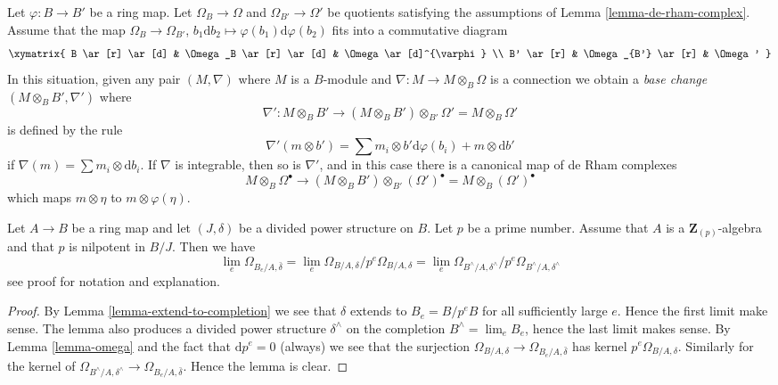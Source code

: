 \begin{remark}
\label{remark-base-change-connection}
Let $\varphi : B \to B'$ be a ring map. Let $\Omega_B \to \Omega$ and
$\Omega_{B'} \to \Omega'$ be quotients satisfying the assumptions of
Lemma \ref{lemma-de-rham-complex}. Assume that the map
$\Omega_B \to \Omega_{B'}$,
$b_1\text{d}b_2 \mapsto \varphi(b_1)\text{d}\varphi(b_2)$ fits into a
commutative diagram
$$
\xymatrix{
B \ar[r] \ar[d] & \Omega_B \ar[r] \ar[d] & \Omega \ar[d]^{\varphi} \\
B' \ar[r] & \Omega_{B'} \ar[r] & \Omega'
}
$$
In this situation, given any pair $(M, \nabla)$ where $M$ is a $B$-module
and $\nabla : M \to M \otimes_B \Omega$ is a connection
we obtain a {\it base change} $(M \otimes_B B', \nabla')$ where
$$
\nabla' :
M \otimes_B B'
\longrightarrow
(M \otimes_B B') \otimes_{B'} \Omega' = M \otimes_B \Omega'
$$
is defined by the rule
$$
\nabla'(m \otimes b') =
\sum m_i \otimes b'\text{d}\varphi(b_i) + m \otimes \text{d}b' 
$$
if $\nabla(m) = \sum m_i \otimes \text{d}b_i$. If $\nabla$ is integrable,
then so is $\nabla'$, and in this case there is a canonical map of
de Rham complexes
\begin{equation}
\label{equation-base-change-map-complexes}
M \otimes_B \Omega^\bullet
\longrightarrow
(M \otimes_B B') \otimes_{B'} (\Omega')^\bullet =
M \otimes_B (\Omega')^\bullet
\end{equation}
which maps $m \otimes \eta$ to $m \otimes \varphi(\eta)$.
\end{remark}

\begin{lemma}
\label{lemma-differentials-completion}
Let $A \to B$ be a ring map and let $(J, \delta)$ be a divided power
structure on $B$. Let $p$ be a prime number. Assume that $A$ is a
$\mathbf{Z}_{(p)}$-algebra and that $p$ is nilpotent in $B/J$. Then
we have
$$
\lim_e \Omega_{B_e/A, \bar\delta} =
\lim_e \Omega_{B/A, \delta}/p^e\Omega_{B/A, \delta} =
\lim_e \Omega_{B^\wedge/A, \delta^\wedge}/p^e \Omega_{B^\wedge/A, \delta^\wedge}
$$
see proof for notation and explanation.
\end{lemma}

\begin{proof}
By Lemma \ref{lemma-extend-to-completion} we see that $\delta$ extends
to $B_e = B/p^eB$ for all sufficiently large $e$. Hence the first limit
make sense. The lemma also produces a divided power structure $\delta^\wedge$
on the completion $B^\wedge = \lim_e B_e$, hence the last limit makes
sense. By Lemma \ref{lemma-omega}
and the fact that $\text{d}p^e = 0$ (always)
we see that the surjection
$\Omega_{B/A, \delta} \to \Omega_{B_e/A, \bar\delta}$ has kernel
$p^e\Omega_{B/A, \delta}$. Similarly for the kernel of 
$\Omega_{B^\wedge/A, \delta^\wedge} \to \Omega_{B_e/A, \bar\delta}$.
Hence the lemma is clear.
\end{proof}



